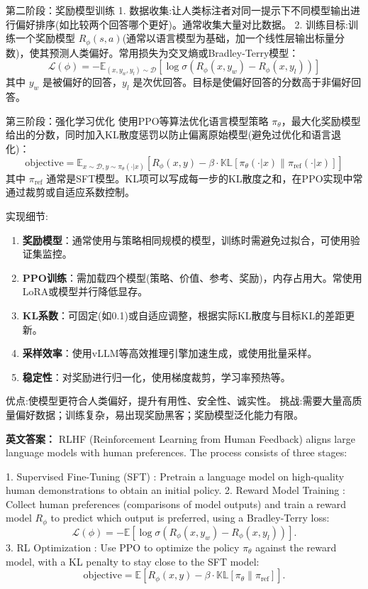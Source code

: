 \documentclass[10pt,a4paper]{ctexart}
\begin{document}
 第二阶段：奖励模型训练   
1.  数据收集:让人类标注者对同一提示下不同模型输出进行偏好排序(如比较两个回答哪个更好)。通常收集大量对比数据。
2.  训练目标:训练一个奖励模型 \(R_\phi(s,a)\)(通常以语言模型为基础，加一个线性层输出标量分数)，使其预测人类偏好。常用损失为交叉熵或Bradley-Terry模型：
   \[
   \mathcal{L}(\phi) = -\mathbb{E}_{(x, y_w, y_l) \sim \mathcal{D}} \left[ \log \sigma \left( R_\phi(x, y_w) - R_\phi(x, y_l) \right) \right]
   \]
   其中 \(y_w\) 是被偏好的回答，\(y_l\) 是次优回答。目标是使偏好回答的分数高于非偏好回答。

 第三阶段：强化学习优化   
使用PPO等算法优化语言模型策略 \(\pi_\theta\)，最大化奖励模型给出的分数，同时加入KL散度惩罚以防止偏离原始模型(避免过优化和语言退化)：
\[
\text{objective} = \mathbb{E}_{x \sim \mathcal{D}, y \sim \pi_\theta(\cdot|x)} \left[ R_\phi(x, y) - \beta \cdot \mathbb{KL}[\pi_\theta(\cdot|x) \| \pi_{\text{ref}}(\cdot|x)] \right]
\]
其中 \(\pi_{\text{ref}}\) 通常是SFT模型。KL项可以写成每一步的KL散度之和，在PPO实现中常通过裁剪或自适应系数控制。

 实现细节:
\begin{enumerate}
    \item \textbf{奖励模型}：通常使用与策略相同规模的模型，训练时需避免过拟合，可使用验证集监控。
    \item \textbf{PPO训练}：需加载四个模型(策略、价值、参考、奖励)，内存占用大。常使用LoRA或模型并行降低显存。
    \item \textbf{KL系数}：可固定(如0.1)或自适应调整，根据实际KL散度与目标KL的差距更新。
    \item \textbf{采样效率}：使用vLLM等高效推理引擎加速生成，或使用批量采样。
    \item \textbf{稳定性}：对奖励进行归一化，使用梯度裁剪，学习率预热等。
\end{enumerate}

 优点:使模型更符合人类偏好，提升有用性、安全性、诚实性。
 挑战:需要大量高质量偏好数据；训练复杂，易出现奖励黑客；奖励模型泛化能力有限。

\textbf{英文答案：}  
RLHF (Reinforcement Learning from Human Feedback) aligns large language models with human preferences. The process consists of three stages:

1.  Supervised Fine-Tuning (SFT) : Pretrain a language model on high-quality human demonstrations to obtain an initial policy.
2.  Reward Model Training : Collect human preferences (comparisons of model outputs) and train a reward model \(R_\phi\) to predict which output is preferred, using a Bradley-Terry loss:
   \[
   \mathcal{L}(\phi) = -\mathbb{E}[\log \sigma(R_\phi(x, y_w) - R_\phi(x, y_l))].
   \]
3.  RL Optimization : Use PPO to optimize the policy \(\pi_\theta\) against the reward model, with a KL penalty to stay close to the SFT model:
   \[
   \text{objective} = \mathbb{E}[R_\phi(x, y) - \beta \cdot \mathbb{KL}[\pi_\theta \| \pi_{\text{ref}}]].
   \]
\end{document}
